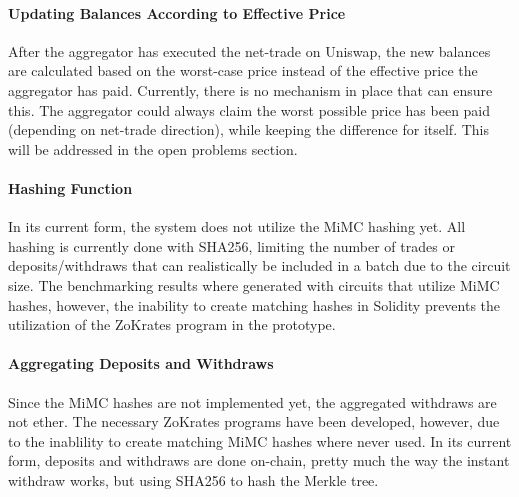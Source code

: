 \documentclass[../../thesis.tex]{subfiles}
\begin{document}
\paragraph{Updating Balances According to Effective Price}
After the aggregator has executed the net-trade on Uniswap, the new balances are calculated based on the worst-case price instead of the effective price the aggregator has paid. Currently, there is no mechanism in place that can ensure this. The aggregator could always claim the worst possible price has been paid (depending on net-trade direction), while keeping the difference for itself. This will be addressed in the open problems section.

\paragraph{Hashing Function}
In its current form, the system does not utilize the MiMC hashing yet. All hashing is currently done with SHA256, limiting the number of trades or deposits/withdraws that can realistically be included in a batch due to the circuit size. The benchmarking results where generated with circuits that utilize MiMC hashes, however, the inability to create matching hashes in Solidity prevents the utilization of the ZoKrates program in the prototype. 

\paragraph{Aggregating Deposits and Withdraws}
Since the MiMC hashes are not implemented yet, the aggregated withdraws are not ether. The necessary ZoKrates programs have been developed, however, due to the inablility to create matching MiMC hashes where never used. In its current form, deposits and withdraws are done on-chain, pretty much the way the instant withdraw works, but using SHA256 to hash the Merkle tree.
\end{document}
